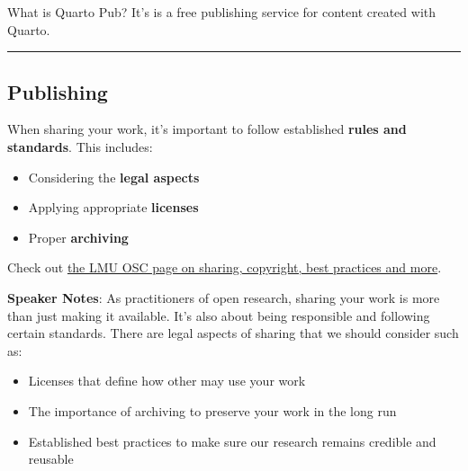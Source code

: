 \documentclass[
  letterpaper,
  DIV=11,
  numbers=noendperiod]{scrartcl}
\providecommand{\tightlist}{%
  \setlength{\itemsep}{0pt}\setlength{\parskip}{0pt}}
\begin{document}
What is Quarto Pub? It's is a free publishing service for content
created with Quarto.

\begin{center}\rule{0.5\linewidth}{0.5pt}\end{center}

\subsection{Publishing}\label{publishing-1}

When sharing your work, it's important to follow established
\textbf{rules and standards}. This includes:

\begin{itemize}
\tightlist
\item
  Considering the \textbf{legal aspects}
\item
  Applying appropriate \textbf{licenses}
\item
  Proper \textbf{archiving}
\end{itemize}

\begin{tcolorbox}[enhanced jigsaw, opacitybacktitle=0.6, toptitle=1mm, colbacktitle=quarto-callout-note-color!10!white, toprule=.15mm, left=2mm, colback=white, colframe=quarto-callout-note-color-frame, opacityback=0, bottomtitle=1mm, breakable, titlerule=0mm, rightrule=.15mm, arc=.35mm, title=\textcolor{quarto-callout-note-color}{\faInfo}\hspace{0.5em}{List of publishing services}, bottomrule=.15mm, coltitle=black, leftrule=.75mm]

Check out
\href{https://lmu-osc.github.io/code-publishing/intro.html}{the LMU OSC
page on sharing, copyright, best practices and more}.

\end{tcolorbox}

\textbf{Speaker Notes}: As practitioners of open research, sharing your
work is more than just making it available. It's also about being
responsible and following certain standards. There are legal aspects of
sharing that we should consider such as:

\begin{itemize}
\item
  Licenses that define how other may use your work
\item
  The importance of archiving to preserve your work in the long run
\item
  Established best practices to make sure our research remains credible
  and reusable
\end{itemize}
\end{document}
